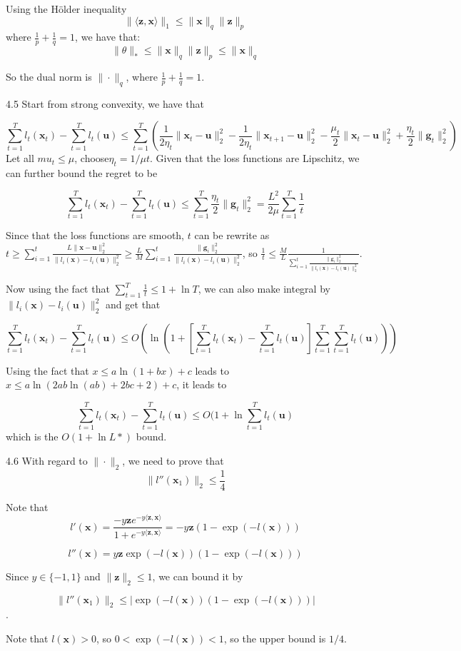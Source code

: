 \documentclass{article}
\begin{document}
Using the H\"older inequality 
$$\|\langle\mathbf{z}, \mathbf{x}\rangle\|_1 \leq \|\mathbf{x}\|_q\|\mathbf{z}\|_p$$
where $\frac{1}{p}+\frac{1}{q}=1$, we have that: 
$$\|\theta\|_*\leq \|\mathbf{x}\|_q\|\mathbf{z}\|_p \leq \|\mathbf{x}\|_q$$

So the dual norm is $\|\cdot\|_q$, where $\frac{1}{p}+\frac{1}{q}=1$.

4.5  Start from strong convexity, we have that

$$\sum_{t=1}^T l_t(\mathbf{x}_t) - \sum_{t=1}^T l_t(\mathbf{u}) \leq \sum_{t=1}^T \left( \frac{1}{2\eta_t} \|\mathbf{x}_t - \mathbf{u}\|^2_2  - \frac{1}{2\eta_t} \|\mathbf{x}_{t+1} - \mathbf{u}\|^2_2 - \frac{\mu_t}{2} \|\mathbf{x}_t - \mathbf{u}\|^2_2 + \frac{\eta_t}{2} \|\mathbf{g}_t\|^2_2 \right)$$
Let all $mu_t\leq \mu$, choose$\eta_t = 1/\mu t$. Given that the loss functions are Lipschitz, we can further bound the regret to be 

$$\sum_{t=1}^T l_t(\mathbf{x}_t) - \sum_{t=1}^T l_t(\mathbf{u}) \leq \sum_{t=1}^T \frac{\eta_t}{2} \|\mathbf{g}_t\|^2_2 =\frac{L^2}{2\mu}  \sum_{t=1}^T \frac{1}{t}$$

Since that the loss functions are smooth, $t$ can be rewrite as $t \geq \sum_{i=1}^t \frac{L \|\mathbf{x} - \mathbf{u} \|^2_2}{\|l_i(\mathbf{x}) -  l_i(\mathbf{u}) \|^2_2} \geq \frac{L}{M} \sum_{i=1}^t \frac{ \|\mathbf{g}_i \|^2_2}{\|l_i(\mathbf{x}) -  l_i(\mathbf{u}) \|^2_2}$, so $\frac{1}{t}\leq \frac{M}{L}\frac{1}{\sum_{i=1}^t \frac{ \|\mathbf{g}_i \|^2_2}{\|l_i(\mathbf{x}) -  l_i(\mathbf{u}) \|^2_2}} $.

Now using the fact that $\sum_{t=1}^T \frac{1}{t} \leq 1 + \ln T$, we can also make integral by $\|l_i(\mathbf{x}) -  l_i(\mathbf{u}) \|^2_2$ and get that 

$$\sum_{t=1}^T l_t(\mathbf{x}_t) - \sum_{t=1}^T l_t(\mathbf{u}) \leq O(\ln (1+ [\sum_{t=1}^T l_t(\mathbf{x}_t) - \sum_{t=1}^T l_t(\mathbf{u}) ] \sum_{t=1}^T \sum_{t=1}^T l_t(\mathbf{u}) ))$$

Using the fact that $x\leq a\ln (1+bx) +c$ leads to $x\leq a\ln (2ab\ln (ab) + 2bc + 2) + c$, it leads to 


$$\sum_{t=1}^T l_t(\mathbf{x}_t) - \sum_{t=1}^T l_t(\mathbf{u})  \leq O(1+\ln \sum_{t=1}^T l_t(\mathbf{u})$$
which is the $O(1+\ln L*)$ bound.

4.6 With regard to $\|\cdot\|_2$, we need to prove that
$$\| l''(\mathbf{x}_1) \|_2 \leq \frac{1}{4}$$

Note that $$ l'(\mathbf{x}) = \frac{-y\mathbf{z} e^{-y\langle \mathbf{z},\mathbf{x} \rangle}}{1 + e^{-y\langle \mathbf{z}, \mathbf{x} \rangle}} = -y\mathbf{z} (1-\exp(-l(\mathbf{x})))$$

$$ l''(\mathbf{x}) = y\mathbf{z} \exp(-l(\mathbf{x})) (1-\exp(-l(\mathbf{x})))$$

	Since $y\in\{-1, 1\}$ and $\|\mathbf{z}\|_2 \leq 1$, we can bound it by
	
	$$\| l''(\mathbf{x}_1) \|_2 \leq \left|\exp(-l(\mathbf{x})) (1-\exp(-l(\mathbf{x})))\right|$$.
	
Note that $l(\mathbf{x})>0$, so $0<\exp(-l(\mathbf{x}))<1$, so the upper bound is $1/4$.
\end{document}
